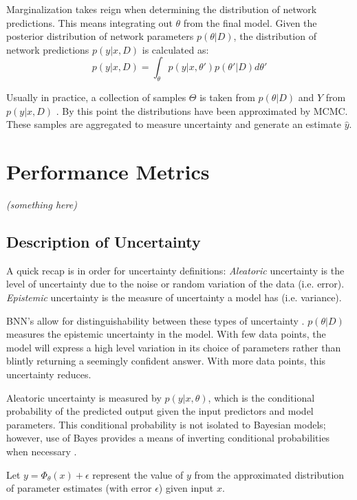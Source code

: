 Marginalization takes reign when determining the distribution of network predictions.  This means integrating out $\theta$ from the final model.  Given the posterior distribution of network parameters $p(\theta|D)$, the distribution of network predictions $p(y|x,D)$ is calculated as:
$$
p(y|x,D) = \int_\theta p(y|x,\theta')p(\theta'|D)d\theta'
$$

Usually in practice, a collection of samples $\Theta$ is taken from $p(\theta|D)$ and $Y$ from $p(y|x,D)$ \cite{Jospin}. By this point the distributions have been approximated by MCMC. These samples are aggregated to measure uncertainty and generate an estimate $\hat{y}$.



\section{Performance Metrics}

\textit{(something here)}

\subsection{Description of Uncertainty}

A quick recap is in order for uncertainty definitions: \textit{Aleatoric} uncertainty is the level of uncertainty due to the noise or random variation of the data (i.e. error).  \textit{Epistemic} uncertainty is the measure of uncertainty a model has (i.e. variance).

BNN's allow for distinguishability between these types of uncertainty \cite{Jospin}.  $p(\theta|D)$ measures the epistemic uncertainty in the model.  With few data points, the model will express a high level variation in its choice of parameters rather than blintly returning a seemingly confident answer.  With more data points, this uncertainty reduces.

Aleatoric uncertainty is measured by $p(y|x,\theta)$, which is the conditional probability of the predicted output given the input predictors and model parameters.  This conditional probability is not isolated to Bayesian models; however, use of Bayes provides a means of inverting conditional probabilities when necessary \cite{Jospin}.


Let $y = \Phi_{\theta} (x) + \epsilon$ represent the value of $y$ from the approximated distribution of parameter estimates (with error $\epsilon$) given input $x$.

